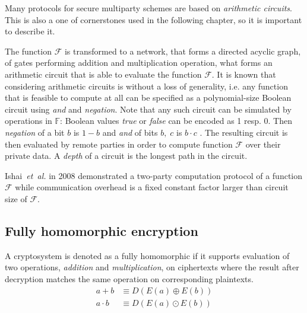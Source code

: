 \documentclass[11pt,oneside,final]{fithesis2}
\newcommand{\eal}{\emph{et~al.}}
\begin{document}
Many protocols for secure multiparty schemes are based on \emph{arithmetic circuits}. This is also a one of cornerstones 
used in the following chapter, so it is important to describe it.

The function $\mathcal{F}$ is transformed to a network, that forms a directed acyclic graph, of gates performing addition 
and multiplication operation, what forms an arithmetic circuit that is able to evaluate the function $\mathcal{F}$.
It is known that considering arithmetic circuits is without a loss of generality, i.e. any function that is feasible to compute 
at all can be specified as a polynomial-size Boolean circuit using \emph{and} and \emph{negation}. Note that any such circuit 
can be simulated by operations in $\mathbb{F}$: Boolean values \emph{true} or \emph{false} can be encoded as 1 resp. 0. Then
\emph{negation} of a bit $b$ is $1-b$ and \emph{and} of bits $b,\;c$ is $b\cdot c$ \citep{smcBook}. The resulting 
circuit is then evaluated by remote parties in order to compute function $\mathcal{F}$ over their private data. 
A \emph{depth} of a circuit is the longest path in the circuit.

Ishai~\eal\citep{Ishai:2008:FCO:1429103.1429148} in 2008 demonstrated a two-party computation protocol of a function
$\mathcal{F}$ while communication overhead is a fixed constant factor larger than circuit size of $\mathcal{F}$. 


% 

    
\subsection{Fully homomorphic encryption}\label{sec:fhe}
    A cryptosystem is denoted as a fully homomorphic if it supports evaluation of two operations, \emph{addition} and \emph{multiplication}, on ciphertexts
    where the result after decryption matches the same operation on corresponding plaintexts.
\begin{subequations}
 \begin{align}
    a + b     &\equiv D\left(E\left(a\right) \oplus E\left(b\right)\right) \\
    a \cdot b &\equiv D\left(E\left(a\right) \odot  E\left(b\right)\right)
 \end{align}
\end{subequations}
    
\end{document}
